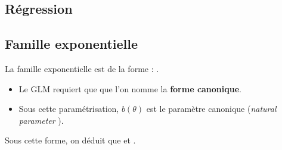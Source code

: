 \documentclass[10pt, french]{article}
\begin{document}
\begin{multicols*}{2}
%
%
%

\columnbreak
\section{Régression}
\subsection{Famille exponentielle}
La famille exponentielle est de la forme : .
\begin{itemize}
	\item	Le GLM requiert que  que l'on nomme la \textbf{forme canonique}.
	\item	Sous cette paramétrisation, $b(\theta)$ est le paramètre canonique (\og \textit{natural parameter} \fg{}).
\end{itemize}

Sous cette forme, on déduit que  et .


\end{multicols*}
\end{document}
